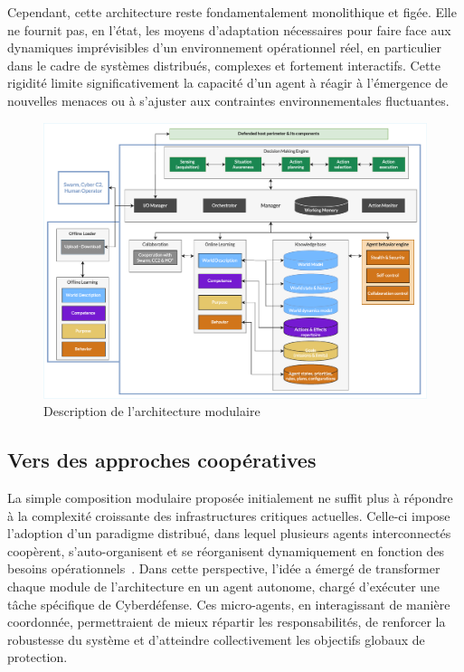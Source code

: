 Cependant, cette architecture reste fondamentalement monolithique et figée. Elle ne fournit pas, en l'état, les moyens d'adaptation nécessaires pour faire face aux dynamiques imprévisibles d'un environnement opérationnel réel, en particulier dans le cadre de systèmes distribués, complexes et fortement interactifs. Cette rigidité limite significativement la capacité d'un agent  à réagir à l'émergence de nouvelles menaces ou à s'ajuster aux contraintes environnementales fluctuantes.


\begin{figure}[h!]
  \centering
  \includegraphics[width=\linewidth]{figures/MASCARA.pdf}
  \caption{Description de l'architecture modulaire }
  \label{fig:mascara}
\end{figure}

\subsection*{Vers des approches coopératives}

La simple composition modulaire proposée initialement ne suffit plus à répondre à la complexité croissante des infrastructures critiques actuelles. Celle-ci impose l'adoption d'un paradigme distribué, dans lequel plusieurs agents interconnectés coopèrent, s'auto-organisent et se réorganisent dynamiquement en fonction des besoins opérationnels~\cite{Ferber1999, Gleizes2008}. Dans cette perspective, l'idée a émergé de transformer chaque module de l'architecture  en un agent autonome, chargé d'exécuter une tâche spécifique de Cyberdéfense. Ces micro-agents, en interagissant de manière coordonnée, permettraient de mieux répartir les responsabilités, de renforcer la robustesse du système et d'atteindre collectivement les objectifs globaux de protection.

